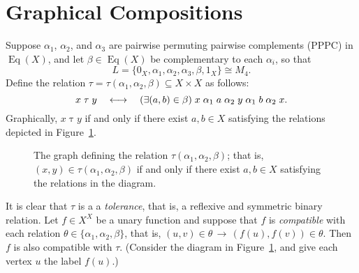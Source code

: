 \documentclass{amsart}
\theoremstyle{plain}
\theoremstyle{definition}
\theoremstyle{definition}
\numberwithin{equation}{section}
\newcommand{\<}{\ensuremath{\langle}}
\renewcommand{\>}{\ensuremath{\rangle}}
\newcommand{\Eq}{\ensuremath{\operatorname{Eq}}}
\newcommand{\rel}{\ensuremath{\mathrel}}
\begin{document}
\section{Graphical Compositions}
Suppose $\alpha_1$, $\alpha_2$, and $\alpha_3$ are pairwise permuting
pairwise complements (\ac{PPPC}) in $\Eq(X)$, and let $\beta\in \Eq(X)$ be
complementary to 
each 
$\alpha_i$, so that 
\[
L = \{0_X, \alpha_1, \alpha_2, \alpha_3, \beta, 1_X\} \cong M_4.
\]  
Define the relation $\tau=\tau(\alpha_1, \alpha_2, \beta)\subseteq X\times X$ as
follows:
\[
x \mathrel{\tau} y \quad \longleftrightarrow \quad (\exists (a, b) \in \beta)\;  
x \rel{\alpha_1} a \rel{\alpha_2} y \rel{\alpha_1} b \rel{\alpha_2} x.
\]
Graphically, $x \mathrel{\tau} y$ if and only if there exist $a, b \in X$
satisfying the relations depicted in Figure~\ref{fig:rho}.

\newcommand\dotsize{1pt}
\begin{figure}
  \caption{The graph defining the relation $\tau(\alpha_1, \alpha_2, \beta)$;
    that is, $(x,y) \in \tau(\alpha_1, \alpha_2, \beta)$ if and only if there
    exist $a, b \in X$ satisfying the relations in the diagram.}
  \label{fig:rho}
\end{figure}

It is clear that $\tau$ is a a \emph{tolerance}, that is, a reflexive and symmetric binary relation.
Let $f\in X^X$ be a unary function and suppose that $f$ is \emph{compatible} with each
relation $\theta \in \{\alpha_1, \alpha_2, \beta\}$, that is, 
$(u,v)\in \theta \, \longrightarrow \, (f(u), f(v))\in \theta$.  Then $f$ is also
compatible with $\tau$. (Consider the diagram in Figure~\ref{fig:rho}, and give
each vertex $u$ the label $f(u)$.)
\end{document}

